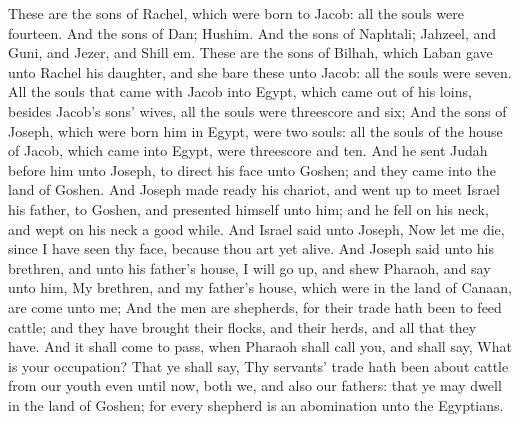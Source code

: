 \begin{biblechapter}
\verse These are the sons of Rachel, which were born to Jacob: all the souls were fourteen.
\verse And the sons of Dan; Hushim.
\verse And the sons of Naphtali; Jahzeel, and Guni, and Jezer, and Shill em.
\verse These are the sons of Bilhah, which Laban gave unto Rachel his daughter, and she bare these unto Jacob: all the souls were seven.
\verse All the souls that came with Jacob into Egypt, which came out of his loins, besides Jacob's sons' wives, all the souls were threescore and six;
\verse And the sons of Joseph, which were born him in Egypt, were two souls: all the souls of the house of Jacob, which came into Egypt, were threescore and ten.
\verse And he sent Judah before him unto Joseph, to direct his face unto Goshen; and they came into the land of Goshen.
\verse And Joseph made ready his chariot, and went up to meet Israel his father, to Goshen, and presented himself unto him; and he fell on his neck, and wept on his neck a good while.
\verse And Israel said unto Joseph, Now let me die, since I have seen thy face, because thou art yet alive.
\verse And Joseph said unto his brethren, and unto his father's house, I will go up, and shew Pharaoh, and say unto him, My brethren, and my father's house, which were in the land of Canaan, are come unto me;
\verse And the men are shepherds, for their trade hath been to feed cattle; and they have brought their flocks, and their herds, and all that they have.
\verse And it shall come to pass, when Pharaoh shall call you, and shall say, What is your occupation?
\verse That ye shall say, Thy servants' trade hath been about cattle from our youth even until now, both we, and also our fathers: that ye may dwell in the land of Goshen; for every shepherd is an abomination unto the Egyptians.
\end{biblechapter}

\flushcolsend\columnbreak %

